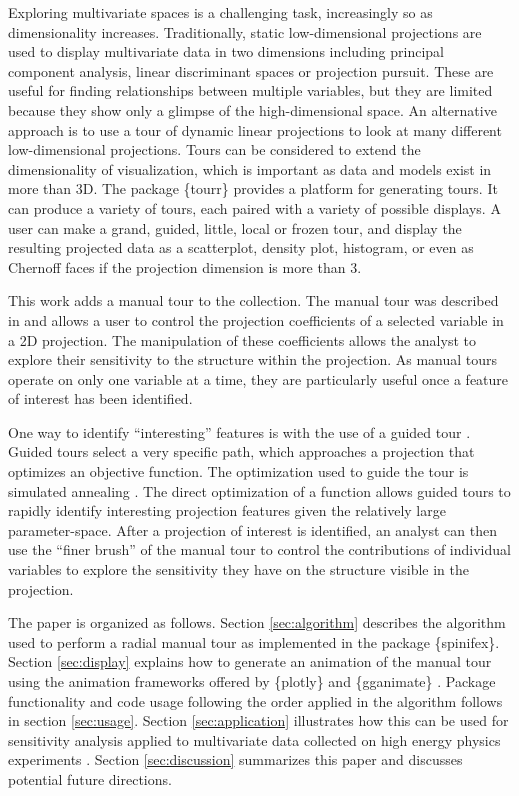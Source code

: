 \documentclass{template/monashthesis}
\begin{document}
Exploring multivariate spaces is a challenging task, increasingly so as dimensionality increases. Traditionally, static low-dimensional projections are used to display multivariate data in two dimensions including principal component analysis, linear discriminant spaces or projection pursuit. These are useful for finding relationships between multiple variables, but they are limited because they show only a glimpse of the high-dimensional space. An alternative approach is to use a tour \autocite{asimov_grand_1985} of dynamic linear projections to look at many different low-dimensional projections. Tours can be considered to extend the dimensionality of visualization, which is important as data and models exist in more than 3D. The package \{tourr\} \autocite{wickham_tourr:_2011} provides a platform for generating tours. It can produce a variety of tours, each paired with a variety of possible displays. A user can make a grand, guided, little, local or frozen tour, and display the resulting projected data as a scatterplot, density plot, histogram, or even as Chernoff faces if the projection dimension is more than 3.

This work adds a manual tour to the collection. The manual tour was described in \textcite{cook_manual_1997} and allows a user to control the projection coefficients of a selected variable in a 2D projection. The manipulation of these coefficients allows the analyst to explore their sensitivity to the structure within the projection. As manual tours operate on only one variable at a time, they are particularly useful once a feature of interest has been identified.

One way to identify ``interesting'' features is with the use of a guided tour \autocite{cook_grand_1995}. Guided tours select a very specific path, which approaches a projection that optimizes an objective function. The optimization used to guide the tour is simulated annealing \autocite{kirkpatrick_optimization_1983}. The direct optimization of a function allows guided tours to rapidly identify interesting projection features given the relatively large parameter-space. After a projection of interest is identified, an analyst can then use the ``finer brush'' of the manual tour to control the contributions of individual variables to explore the sensitivity they have on the structure visible in the projection.

The paper is organized as follows. Section \ref{sec:algorithm} describes the algorithm used to perform a radial manual tour as implemented in the package \{spinifex\}. Section \ref{sec:display} explains how to generate an animation of the manual tour using the animation frameworks offered by \{plotly\} \autocite{sievert_interactive_2020} and \{gganimate\} \autocite{pedersen_gganimate_2020}. Package functionality and code usage following the order applied in the algorithm follows in section \ref{sec:usage}. Section \ref{sec:application} illustrates how this can be used for sensitivity analysis applied to multivariate data collected on high energy physics experiments \autocite{wang_mapping_2018}. Section \ref{sec:discussion} summarizes this paper and discusses potential future directions.
\end{document}
